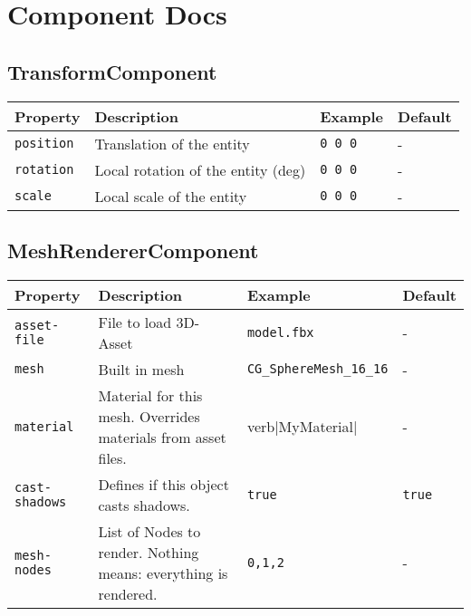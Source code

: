 \section{Component Docs}
\label{sec:compDocs}

\subsection{TransformComponent}
\label{comp:TransformComponent}
\begin{tabular}{|l|l|l|l|}
    \hline
    Property & Description & Example & Default \\ \hline
    \verb|position| & Translation of the entity & \verb|0 0 0| & - \\ \hline
    \verb|rotation| & Local rotation of the entity (deg) & \verb|0 0 0| & - \\ \hline
    \verb|scale| & Local scale of the entity & \verb|0 0 0| & - \\ \hline
\end{tabular}

\subsection{MeshRendererComponent}
\label{comp:MeshRendererComponent}
\begin{tabular}{|l|l|l|l|}
    \hline
    Property & Description & Example & Default \\ \hline
    \verb|asset-file| & File to load 3D-Asset & \verb|model.fbx| & - \\ \hline
    \verb|mesh| & Built in mesh & \verb|CG_SphereMesh_16_16| & - \\ \hline
    \verb|material| & Material for this mesh. Overrides materials from asset files. & verb|MyMaterial| & - \\ \hline
    \verb|cast-shadows| & Defines if this object casts shadows. & \verb|true| & \verb|true| \\ \hline
    \verb|mesh-nodes| & List of Nodes to render. Nothing means: everything is rendered. & \verb|0,1,2| & - \\ \hline
\end{tabular}

